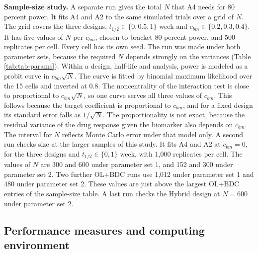 \documentclass[
  11pt,
]{article}
\begin{document}
\textbf{Sample-size study.} A separate run gives the total \(N\) that A4
needs for 80 percent power. It fits A4 and A2 to the same simulated
trials over a grid of \(N\). The grid covers the three designs,
\(t_{1/2} \in \{0, 0.5, 1\}\) week and \(c_{bm} \in \{0.2, 0.3, 0.4\}\).
It has five values of \(N\) per \(c_{bm}\), chosen to bracket 80 percent
power, and 500 replicates per cell. Every cell has its own seed. The
run was made under both parameter sets, because the required \(N\)
depends strongly on the variances (Table \ref{tab:tab-params}).
Within a design, half-life and analysis, power is modeled as a probit
curve in \(c_{bm}\sqrt{N}\). The curve is fitted by binomial maximum
likelihood over the 15 cells and inverted at 0.8. The
noncentrality of the interaction test is close to proportional to
\(c_{bm}\sqrt{N}\), so one curve serves all three values of \(c_{bm}\).
This follows because the target coefficient is proportional to
\(c_{bm}\), and for a fixed design its standard error falls as
\(1/\sqrt{N}\). The proportionality is not exact, because the residual
variance of the drug response given the biomarker also depends on
\(c_{bm}\).
The interval for \(N\) reflects Monte Carlo error under that model only.
A second run checks size at the larger samples of this study. It
fits A4 and A2 at \(c_{bm} = 0\), for the three designs and
\(t_{1/2} \in \{0, 1\}\) week, with 1,000 replicates per cell. The
values of \(N\) are 300 and 600 under parameter set 1, and
152 and 300 under parameter set 2. Two further OL+BDC runs use
1,012 under parameter set 1 and 480 under parameter set 2. These
values are just above the largest OL+BDC entries of the sample-size
table. A last
run checks the Hybrid design at \(N = 600\) under parameter set 2.

\subsection{Performance measures and computing environment}\label{sec-perf}
\end{document}
